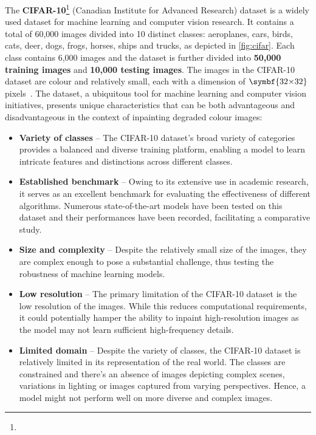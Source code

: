 The \textbf{CIFAR-10}\footnote{\cifar} (Canadian Institute for Advanced Research) dataset is a widely used dataset for machine learning and computer vision research. It contains a total of 60,000 images divided into 10 distinct classes: aeroplanes, cars, birds, cats, deer, dogs, frogs, horses, ships and trucks, as depicted in \autoref{fig:cifar}. Each class contains 6,000 images and the dataset is further divided into \textbf{50,000 training images} and \textbf{10,000 testing images}. The images in the CIFAR-10 dataset are colour and relatively small, each with a dimension of $\symbf{32\stimes32}$ pixels~\supercite{cifar}. The dataset, a ubiquitous tool for machine learning and computer vision initiatives, presents unique characteristics that can be both advantageous and disadvantageous in the context of inpainting degraded colour images:
\begin{itemize}[leftmargin=1.5em]
    \setlength\itemsep{0.2cm}

    \item \textbf{Variety of classes} -- The CIFAR-10 dataset's broad variety of categories provides a balanced and diverse training platform, enabling a model to learn intricate features and distinctions across different classes.

    \item \textbf{Established benchmark} -- Owing to its extensive use in academic research, it serves as an excellent benchmark for evaluating the effectiveness of different algorithms. Numerous state-of-the-art models have been tested on this dataset and their performances have been recorded, facilitating a comparative study.

    \item \textbf{Size and complexity} -- Despite the relatively small size of the images, they are complex enough to pose a substantial challenge, thus testing the robustness of machine learning models.

    \item \textbf{Low resolution} -- The primary limitation of the CIFAR-10 dataset is the low resolution of the images. While this reduces computational requirements, it could potentially hamper the ability to inpaint high-resolution images as the model may not learn sufficient high-frequency details.

    \item \textbf{Limited domain} -- Despite the variety of classes, the CIFAR-10 dataset is relatively limited in its representation of the real world. The classes are constrained and there's an absence of images depicting complex scenes, variations in lighting or images captured from varying perspectives. Hence, a model might not perform well on more diverse and complex images.
\end{itemize}

